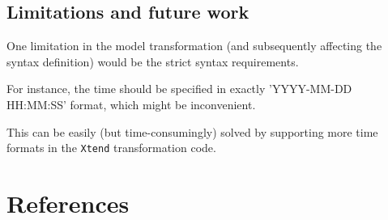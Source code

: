 \documentclass[12pt, letterpaper, twoside]{article}
\begin{document}
\subsection{Limitations and future work}
One limitation in the model transformation (and subsequently affecting the syntax definition) would be the strict syntax requirements.  

For instance, the time should be specified in exactly 'YYYY-MM-DD HH:MM:SS' format, which might be inconvenient.

This can be easily (but time-consumingly) solved by supporting more time formats in the \texttt{Xtend} transformation code.





\newpage

\section{References}
\end{document}
